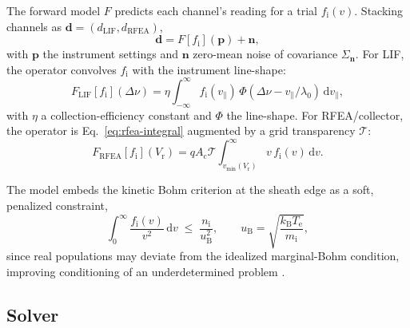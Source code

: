 The forward model $F$ predicts each channel's reading for a trial $f_{\mathrm{i}}(v)$. Stacking channels as $\mathbf{d} = (d_{\mathrm{LIF}}, d_{\mathrm{RFEA}})$,
\begin{equation}
\mathbf{d} = F[f_{\mathrm{i}}](\mathbf{p}) + \mathbf{n},
\label{ch19-eq:forward-general}
\end{equation}
with $\mathbf{p}$ the instrument settings and $\mathbf{n}$ zero-mean noise of covariance $\Sigma_{\mathbf{n}}$. For LIF, the operator convolves $f_{\mathrm{i}}$ with the instrument line-shape:
\begin{equation}
F_{\mathrm{LIF}}[f_{\mathrm{i}}](\Delta\nu) = \eta \int_{-\infty}^{\infty} f_{\mathrm{i}}(v_{\parallel})\, \Phi(\Delta\nu - v_{\parallel}/\lambda_0)\, \mathrm{d}v_{\parallel},
\label{eq:forward-lif}
\end{equation}
with $\eta$ a collection-efficiency constant and $\Phi$ the line-shape. For RFEA/collector, the operator is Eq.~\eqref{eq:rfea-integral} augmented by a grid transparency $\mathcal{T}$:
\begin{equation}
F_{\mathrm{RFEA}}[f_{\mathrm{i}}](V_{\mathrm{r}}) = q A_{\mathrm{c}} \mathcal{T} \int_{v_{\min}(V_{\mathrm{r}})}^{\infty} v\, f_{\mathrm{i}}(v)\, \mathrm{d}v .
\label{eq:forward-rfea}
\end{equation}

The model embeds the kinetic Bohm criterion at the sheath edge as a soft, penalized constraint,
\begin{equation}
\int_{0}^{\infty} \frac{f_{\mathrm{i}}(v)}{v^2}\, \mathrm{d}v \;\le\; \frac{n_{\mathrm{i}}}{u_{\mathrm{B}}^2}, \qquad u_{\mathrm{B}} = \sqrt{\frac{k_{\mathrm{B}} T_{\mathrm{e}}}{m_{\mathrm{i}}}},
\label{eq:bohm-constraint}
\end{equation}
since real populations may deviate from the idealized marginal-Bohm condition, improving conditioning of an underdetermined problem \cite{ref0685}.

\subsection{Solver}
\label{sec:solver}

